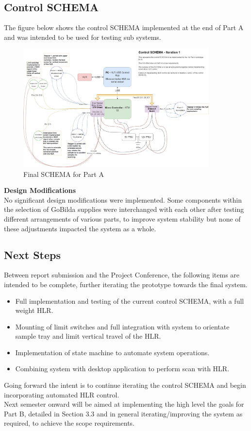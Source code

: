 \documentclass{UoNMCHA}
\numberwithin{equation}{section}
\begin{document}
\subsection{Control SCHEMA}
The figure below shows the control SCHEMA implemented at the end of Part A and was intended to be used for testing sub systems.\\
\begin{figure}[h]
\centering
\includegraphics[width=0.9\textwidth]{FYP_SCHEMA_20221020.jpg}
\caption{Final SCHEMA for Part A}
\label{fig:Part A SCHEMA}
\end{figure}
\textbf{Design Modifications}\\
No significant design modifications were implemented. Some components within the selection of GoBilda supplies were interchanged with each other after testing different arrangements of various parts, to improve system stability but none of these adjustments impacted the system as a whole. 
\subsection{Next Steps}
Between report submission and the Project Conference, the following items are intended to be complete, further iterating the prototype towards the final system. \\
\begin{itemize}
	\item Full implementation and testing of the current control SCHEMA, with a full weight HLR.
	\item Mounting of limit switches and full integration with system to orientate sample tray and limit vertical travel of the HLR.
	\item Implementation of state machine to automate system operations.
	\item Combining system with desktop application to perform scan with HLR.
\end{itemize}
Going forward the intent is to continue iterating the control SCHEMA and begin incorporating automated HLR control.\\
Next semester onward will be aimed at implementing the high level the goals for Part B, detailed in Section 3.3 and in general iterating/improving the system as required, to achieve the scope requirements.\\
\newpage
\end{document}
